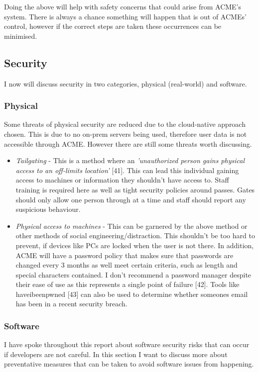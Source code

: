   Doing the above will help with safety concerns that could arise from ACME's system. There is always a chance something will happen that is out of 
  ACMEs' control, however if the correct steps are taken these occurrences can be minimised.

  \subsection{Security}
  I now will discuss security in two categories, physical (real-world) and software.

  \subsubsection{Physical}
  \vspace{0.2cm}
  Some threats of physical security are reduced due to the cloud-native approach chosen. This is due to no on-prem servers being used, therefore 
  user data is not accessible through ACME. However there are still some threats worth discussing.

  \begin{itemize}
    \item \textit{Tailgating} - This is a method where an \textit{'unauthorized person gains physical access to an off-limits location'} [41]. This can 
    lead this individual gaining access to machines or information they shouldn't have access to. Staff training is required here as well as tight security
    policies around passes. Gates should only allow one person through at a time and staff should report any suspicious behaviour.

    \item \textit{Physical access to machines} - This can be garnered by the above method or other methods of social engineering/distraction. This shouldn't
    be too hard to prevent, if devices like PCs are locked when the user is not there. In addition, ACME will have a password policy that makes sure that 
    passwords are changed every 3 months as well meet certain criteria, such as length and special characters contained. I don't recommend a password manager 
    despite their ease of use as this represents a single point of failure [42]. Tools like haveibeenpwned [43] can also be used to determine whether someones 
    email has been in a recent security breach.
  
  \end{itemize}

  \subsubsection{Software}
  I have spoke throughout this report about software security risks that can occur if developers are not careful. In this section I want to discuss
  more about preventative measures that can be taken to avoid software issues from happening.

